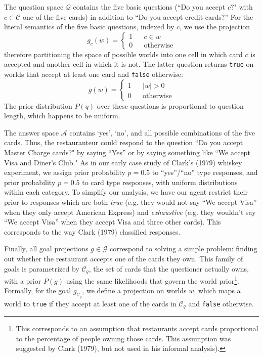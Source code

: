 \documentclass[12pt, floatsintext, jou]{apa6}
\begin{document}
The question space $\mathcal{Q}$ contains the five basic questions (``Do you accept $c$?" with $c \in \mathcal{C}$ one of the five cards) in addition to ``Do you accept credit cards?'' For the literal semantics of the five basic questions, indexed by $c$, we use the projection 
$$g_c(w) = \left\{\begin{array}{rcl} 1 && c \in w \\ 0 && \textrm{otherwise}\end{array}\right.$$ 
therefore partitioning the space of possible worlds into one cell  in which card $c$ is accepted and another cell in which it is not. The latter question returns \texttt{true} on worlds that accept at least one card and \texttt{false} otherwise: 
$$g(w) =  \left\{\begin{array}{rcl} 1 && |w| > 0 \\ 0 && \textrm{otherwise}\end{array}\right.$$ 
The prior distribution $P(q)$ over these questions is proportional to question length, which happens to be uniform.

The answer space $\mathcal{A}$ contains `yes', `no', and all possible combinations of the five cards. Thus, the restauranteur could respond to the question ``Do you accept Master Charge cards?" by saying ``Yes'' or by saying something like ``We accept Visa and Diner's Club." As in our early case study of Clark's (1979) whiskey experiment, we assign prior probability $p = 0.5$ to ``yes''/``no'' type responses, and prior probability $p = 0.5$ to card type responses, with uniform distributions within each category. To simplify our analysis, we have our agent restrict their prior to responses which are both \emph{true} (e.g. they would not say ``We accept Visa'' when they only accept American Express) and \emph{exhaustive} (e.g. they wouldn't  say ``We accept Visa'' when they accept Visa and three other cards). This corresponds to the way Clark (1979) classified responses. 

Finally, all goal projections $g \in \mathcal{G}$ correspond to solving a simple problem: finding out whether the restaurant accepts one of the cards they own. This family of goals is parametrized by $\mathcal{C}_q$, the set of cards that the questioner actually owns, with a prior $P(g)$ using the same likelihoods that govern the world prior\footnote{This corresponds to an assumption that restaurants accept cards proportional to the percentage of people owning those cards. This assumption was suggested by Clark (1979), but not used in his informal analysis).}. Formally, for the goal $g_{\mathcal{C}_q}$, we define a projection on worlds $w$, which maps a world to \texttt{true} if they accept at least one of the cards in $\mathcal{C}_q$ and \texttt{false} otherwise. 
\end{document}
